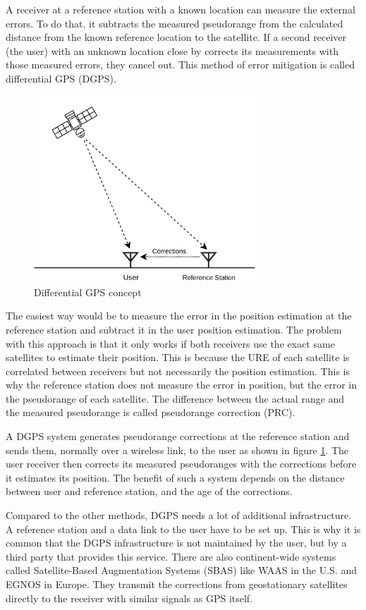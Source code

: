 A receiver at a reference station with a known location can measure the external errors.
To do that, it subtracts the measured pseudorange from the calculated distance from the known reference location to the satellite.
If a second receiver (the user) with an unknown location close by corrects its measurements with those measured errors, they cancel out.
This method of error mitigation is called differential GPS (DGPS).

\begin{figure}[ht]
 \centering
 \includegraphics[height=7cm]{images/Differential_GPS.png}
 \caption{Differential GPS concept}
 \label{fig:dgps}
\end{figure}

The easiest way would be to measure the error in the position estimation at the reference station and subtract it in the user position estimation.
The problem with this approach is that it only works if both receivers use the exact same satellites to estimate their position.
This is because the URE of each satellite is correlated between receivers but not necessarily the position estimation.
This is why the reference station does not measure the error in position, but the error in the pseudorange of each satellite.
The difference between the actual range and the measured pseudorange is called pseudorange correction (PRC).

A DGPS system generates pseudorange corrections at the reference station and sends them, normally over a wireless link, to the user as shown in figure \ref{fig:dgps}.
The user receiver then corrects its measured pseudoranges with the corrections before it estimates its position.
The benefit of such a system depends on the distance between user and reference station, and the age of the corrections.

Compared to the other methods, DGPS needs a lot of additional infrastructure.
A reference station and a data link to the user have to be set up.
This is why it is common that the DGPS infrastructure is not maintained by the user, but by a third party that provides this service.
There are also continent-wide systems called Satellite-Based Augmentation Systems (SBAS) like WAAS in the U.S. and EGNOS in Europe.
They transmit the corrections from geostationary satellites directly to the receiver with similar signals as GPS itself.
\cite{misra2011global}

